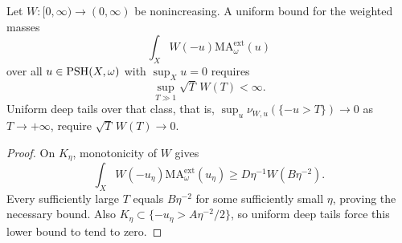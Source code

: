 \begin{corollary}\label{cor:rotational-necessary-weights}
Let $W\colon[0,\infty)\to(0,\infty)$ be nonincreasing. A uniform bound for the
weighted masses
\[
 \int_X W(-u)\mathrm{MA}^{\mathrm{ext}}_\omega(u)
\]
over all $u\in\mathrm{PSH}(X,\omega)$ with $\sup_Xu=0$ requires
\[
 \sup_{T\gg1}\sqrt T\,W(T)<\infty.
\]
Uniform deep tails over that class, that is, $\sup_u\nu_{W,u}(\{-u>T\})\to0$ as $T\to+\infty$, require $\sqrt T\,W(T)\to0$.
\end{corollary}
\begin{proof}
On $K_\eta$, monotonicity of $W$ gives
\[
 \int_XW(-u_\eta)\mathrm{MA}^{\mathrm{ext}}_\omega(u_\eta)
       \geq D\eta^{-1}W(B\eta^{-2}).
\]
Every sufficiently large $T$ equals $B\eta^{-2}$ for some sufficiently small
$\eta$, proving the necessary bound.
Also $K_\eta\subset\{-u_\eta>A\eta^{-2}/2\}$, so uniform deep tails force
this lower bound to tend to zero.
\end{proof}


